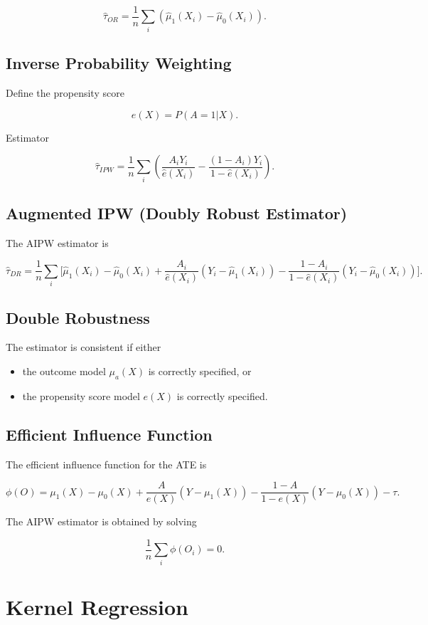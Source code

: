 \documentclass[a4paper,10pt]{article}
\begin{document}
\[
\hat\tau_{OR}
=
\frac{1}{n}
\sum_i
\left(
\hat\mu_1(X_i) - \hat\mu_0(X_i)
\right).
\]

\subsection{Inverse Probability Weighting}

Define the propensity score

\[
e(X) = P(A=1|X).
\]

Estimator

\[
\hat\tau_{IPW}
=
\frac{1}{n}
\sum_i
\left(
\frac{A_i Y_i}{\hat e(X_i)}
-
\frac{(1-A_i)Y_i}{1-\hat e(X_i)}
\right).
\]

\subsection{Augmented IPW (Doubly Robust Estimator)}

The AIPW estimator is

\[
\hat\tau_{DR}
=
\frac{1}{n}
\sum_i
\Bigg[
\hat\mu_1(X_i) - \hat\mu_0(X_i)
+
\frac{A_i}{\hat e(X_i)}(Y_i-\hat\mu_1(X_i))
-
\frac{1-A_i}{1-\hat e(X_i)}(Y_i-\hat\mu_0(X_i))
\Bigg].
\]

\subsection{Double Robustness}

The estimator is consistent if either

\begin{itemize}
\item the outcome model $\mu_a(X)$ is correctly specified, or
\item the propensity score model $e(X)$ is correctly specified.
\end{itemize}

\subsection{Efficient Influence Function}

The efficient influence function for the ATE is

\[
\phi(O)
=
\mu_1(X) - \mu_0(X)
+
\frac{A}{e(X)}(Y-\mu_1(X))
-
\frac{1-A}{1-e(X)}(Y-\mu_0(X))
-
\tau.
\]

The AIPW estimator is obtained by solving

\[
\frac{1}{n}\sum_i \phi(O_i) = 0.
\]

\section{Kernel Regression}
\end{document}
